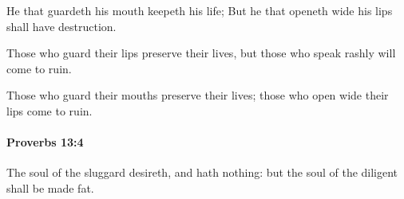 			\begin{versebox}
					\item[BHS] 
					\item[ASV] He that guardeth his mouth keepeth his life; But he that openeth wide his lips shall have destruction.
					\item[NIV] Those who guard their lips preserve their lives, but those who speak rashly will come to ruin.
					\item[NRSV] Those who guard their mouths preserve their lives; those who open wide their lips come to ruin.
			\end{versebox}

		\paragraph{Proverbs 13:4} %
			\label{PROVERBS-13-4}

			The soul of the sluggard desireth, and hath nothing: but the soul of the diligent shall be made fat.

